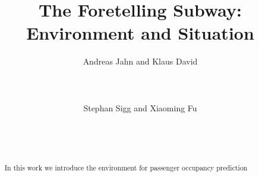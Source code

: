 \documentclass{sig-alternate}
\begin{document}
\title{The Foretelling Subway: Environment and Situation}

%
\author{
%
%
\alignauthor
Andreas Jahn and Klaus David\\
       \\
       \\
       \\
\alignauthor
Stephan Sigg and Xiaoming Fu\\
       \\
       \\
       \\
}

\maketitle

\begin{abstract}
In this work we introduce the environment for passenger occupancy prediction
\end{abstract}









\let\oldtocsubsection=\tocsubsection


\balance

\label{sec:references}

\end{document}
